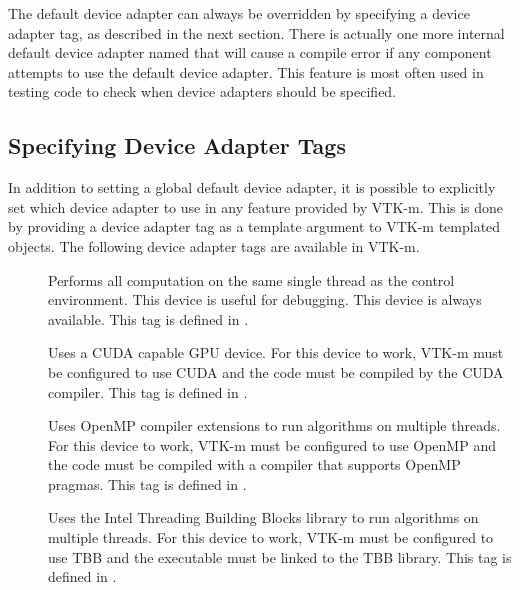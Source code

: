 
The default device adapter can always be overridden by specifying a device
adapter tag, as described in the next section. There is actually one more
internal default device adapter named
 that will cause a compile error if
any component attempts to use the default device adapter. This feature is
most often used in testing code to check when device adapters should be
specified.

\subsection{Specifying Device Adapter Tags}

In addition to setting a global default device adapter, it is possible to
explicitly set which device adapter to use in any feature provided by
VTK-m. This is done by providing a device adapter tag as a template
argument to VTK-m templated objects. The following device adapter tags are
available in VTK-m.


\begin{description}
\item[]  Performs all
  computation on the same single thread as the control environment. This
  device is useful for debugging. This device is always available. This tag
  is defined in .
\item[]  Uses a CUDA capable
  GPU device. For this device to work, VTK-m must be configured to use CUDA
  and the code must be compiled by the CUDA 
  compiler. This tag is defined in
  .
\item[]  Uses OpenMP
  compiler extensions to run algorithms on multiple threads. For this
  device to work, VTK-m must be configured to use OpenMP and the code must be
  compiled with a compiler that supports OpenMP pragmas. This tag is
  defined in .
\item[]
    Uses the Intel
  Threading Building Blocks library to run algorithms on multiple
  threads. For this device to work, VTK-m must be configured to use TBB and
  the executable must be linked to the TBB library. This tag is defined in
  .
\end{description}

